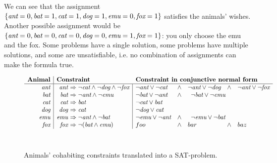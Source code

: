 We can see that the assignment $\{\text{\em ant}=0, \text{\em bat}=1, \text{\em cat}=1, \text{\em dog}=1, \text{\em emu}=0, \text{\em fox}=1\}$
satisfies the animals' wishes.
Another possible assignment would be $\{\text{\em ant}=0, \text{\em bat}=0, \text{\em cat}=0, \text{\em dog}=0, \text{\em emu}=1, \text{\em fox}=1\}$: you only choose the emu and the fox. 
Some problems have a single solution, some problems have multiple solutions, and some are unsatisfiable, i.e. no combination of assignments can make the formula true.

 \begin{figure}[t]
  $$\begin{array}{r | r @{~} l | l @{\quad \wedge \quad } l @{\quad \wedge \quad} l }
   \textbf{Animal}
                & \multicolumn{2}{l}{\textbf{Constraint}} 
                                        & \multicolumn{3}{l}{\textbf{Constraint in conjunctive normal form}} \\ \hline

    \ant        & \ant &\Rightarrow \neg{}\cat \wedge \neg{}\dog \wedge \neg{}\fox 
    								    & \neg{}\ant \vee \neg{}\cat 
                                        & \neg{}\ant \vee \neg{}\dog 
                                        & \neg{}\ant \vee \neg{}\fox \\

   \bat         & \bat &\Rightarrow \neg{}\ant \wedge \neg{}\emu
   								        & \neg{}\bat \vee \neg{}\ant 
                                        & \multicolumn{2}{l}{\neg{}\bat \vee \neg{}\emu} \\
   \cat         & \cat &\Rightarrow \bat & \multicolumn{3}{l}{\neg{}\cat \vee \bat} \\
   \dog         & \dog &\Rightarrow \cat & \multicolumn{3}{l}{\neg{}\dog \vee \cat} \\
   \emu         & \emu &\Rightarrow \neg{}\ant \wedge \neg{}\bat
   										& \neg{}\emu \vee \neg{}\ant 
                                        & \multicolumn{2}{l}{\neg{}\emu \vee \neg{}\bat} \\
   \fox         & \fox &\Rightarrow \neg (\bat \wedge \emu) 
   									    & foo 
   									    & bar
   									    & baz \\

  \end{array}$$ \\

  \caption{Animals' cohabiting constraints translated into a SAT-problem.}
  \label{fig:animalCohabitingProblem}
\end{figure}




